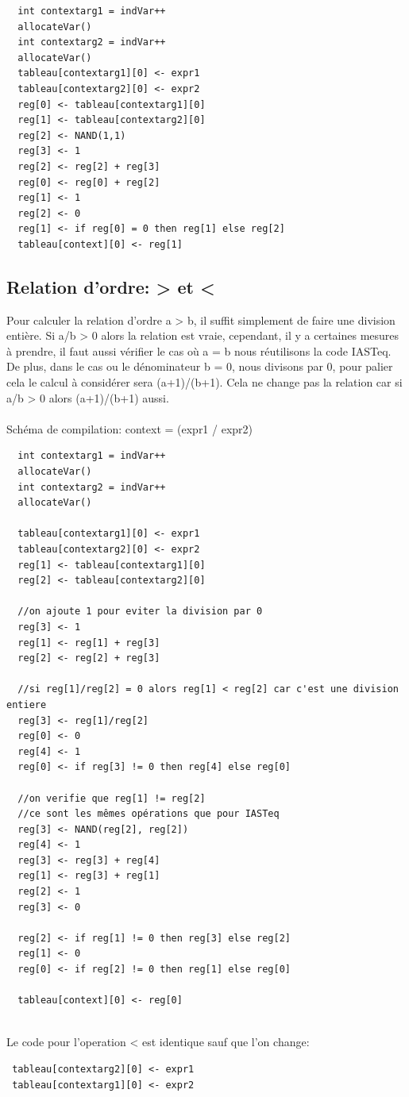 \documentclass[a4paper,12pt]{report}
\begin{document}
\begin{verbatim}
  int contextarg1 = indVar++
  allocateVar()
  int contextarg2 = indVar++
  allocateVar()
  tableau[contextarg1][0] <- expr1
  tableau[contextarg2][0] <- expr2
  reg[0] <- tableau[contextarg1][0]
  reg[1] <- tableau[contextarg2][0]
  reg[2] <- NAND(1,1)
  reg[3] <- 1
  reg[2] <- reg[2] + reg[3]
  reg[0] <- reg[0] + reg[2]
  reg[1] <- 1
  reg[2] <- 0
  reg[1] <- if reg[0] = 0 then reg[1] else reg[2]
  tableau[context][0] <- reg[1]
\end{verbatim}

\subsection{Relation d'ordre: > et <}
Pour calculer la relation d'ordre a > b, il suffit simplement de faire une division entière.
Si a/b > 0 alors la relation est vraie, cependant, il y a certaines mesures à prendre,
il faut aussi vérifier le cas où a = b nous réutilisons la code IASTeq. De plus, dans le cas ou le dénominateur b = 0, nous divisons
par 0, pour palier cela le calcul à considérer sera (a+1)/(b+1). Cela ne change pas la relation car si a/b > 0 alors (a+1)/(b+1) aussi.
\\ \\
Schéma de compilation: context = (expr1 / expr2)
\begin{verbatim}
  int contextarg1 = indVar++
  allocateVar()
  int contextarg2 = indVar++
  allocateVar()
  
  tableau[contextarg1][0] <- expr1
  tableau[contextarg2][0] <- expr2
  reg[1] <- tableau[contextarg1][0]
  reg[2] <- tableau[contextarg2][0]
    
  //on ajoute 1 pour eviter la division par 0
  reg[3] <- 1
  reg[1] <- reg[1] + reg[3]
  reg[2] <- reg[2] + reg[3]
    
  //si reg[1]/reg[2] = 0 alors reg[1] < reg[2] car c'est une division entiere
  reg[3] <- reg[1]/reg[2]
  reg[0] <- 0
  reg[4] <- 1
  reg[0] <- if reg[3] != 0 then reg[4] else reg[0]
    
  //on verifie que reg[1] != reg[2]
  //ce sont les mêmes opérations que pour IASTeq
  reg[3] <- NAND(reg[2], reg[2])
  reg[4] <- 1
  reg[3] <- reg[3] + reg[4]
  reg[1] <- reg[3] + reg[1]
  reg[2] <- 1
  reg[3] <- 0
  
  reg[2] <- if reg[1] != 0 then reg[3] else reg[2]
  reg[1] <- 0
  reg[0] <- if reg[2] != 0 then reg[1] else reg[0]
    
  tableau[context][0] <- reg[0]
		
\end{verbatim}
Le code pour l'operation < est identique sauf que l'on change:
\begin{verbatim}
 tableau[contextarg2][0] <- expr1
 tableau[contextarg1][0] <- expr2
\end{verbatim}
\end{document}
